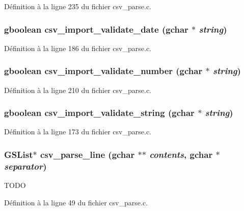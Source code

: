 Définition à la ligne 235 du fichier csv\_\-parse.c.

\subsubsection[{csv\_\-import\_\-validate\_\-date}]{\setlength{\rightskip}{0pt plus 5cm}gboolean csv\_\-import\_\-validate\_\-date (gchar $\ast$ {\em string})}\label{csv__parse_8c_af4d607fcfbc216878fc8591033bb0f2f}


Définition à la ligne 186 du fichier csv\_\-parse.c.

\subsubsection[{csv\_\-import\_\-validate\_\-number}]{\setlength{\rightskip}{0pt plus 5cm}gboolean csv\_\-import\_\-validate\_\-number (gchar $\ast$ {\em string})}\label{csv__parse_8c_a55d8803bfc38b12d081836d7a6bd00ee}


Définition à la ligne 210 du fichier csv\_\-parse.c.

\subsubsection[{csv\_\-import\_\-validate\_\-string}]{\setlength{\rightskip}{0pt plus 5cm}gboolean csv\_\-import\_\-validate\_\-string (gchar $\ast$ {\em string})}\label{csv__parse_8c_a5585e5ea29132606796d284a460945f9}


Définition à la ligne 173 du fichier csv\_\-parse.c.

\subsubsection[{csv\_\-parse\_\-line}]{\setlength{\rightskip}{0pt plus 5cm}GSList$\ast$ csv\_\-parse\_\-line (gchar $\ast$$\ast$ {\em contents}, \/  gchar $\ast$ {\em separator})}\label{csv__parse_8c_a4e3f7a27110b27f240d95aebd8ec469c}
TODO 

Définition à la ligne 49 du fichier csv\_\-parse.c.

